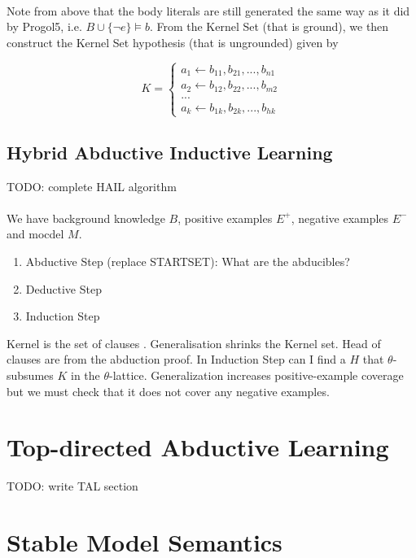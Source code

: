 \documentclass{article}
\theoremstyle{plain}
\theoremstyle{definition}
\begin{document}
\begin{multicols}{2}
\paragraph{} Note from above that the body literals are still generated the same way as it did by Progol5, i.e. $B \cup \{\lnot e\} \models b$. From the Kernel Set (that is ground), we then construct the Kernel Set hypothesis (that is ungrounded) given by

\[ 
K = \begin{cases}
a_1 \leftarrow b_{11}, b_{21}, ..., b_{n1}\\
a_2 \leftarrow b_{12}, b_{22}, ..., b_{m2}\\
...\\
a_k \leftarrow b_{1k}, b_{2k}, ..., b_{hk}
\end{cases}
\]

\subsection{Hybrid Abductive Inductive Learning}

TODO: complete HAIL algorithm

\paragraph{} We have background knowledge $B$, positive examples $E^+$, negative examples $E^-$ and mocdel $M$. 
\begin{enumerate}
\item Abductive Step (replace STARTSET): What are the abducibles?
\item Deductive Step
\item Induction Step
\end{enumerate}

Kernel is the set of clauses . Generalisation shrinks the Kernel set. Head of clauses are from the abduction proof. In Induction Step can I find a $H$ that $\theta$-subsumes $K$ in the $\theta$-lattice. Generalization increases positive-example coverage but we must check that it does not cover any negative examples.

\section{Top-directed Abductive Learning}

TODO: write TAL section

\section{Stable Model Semantics}


\end{multicols}
\end{document}
